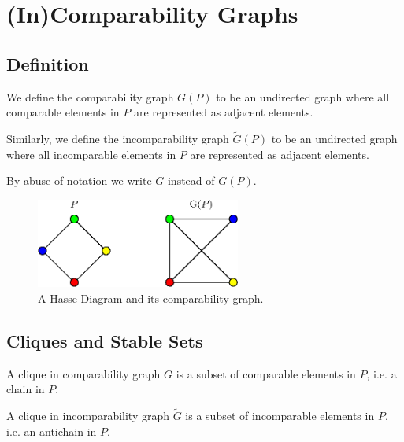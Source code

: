 \section{(In)Comparability Graphs}
\label{tree:poset:graph}


\subsection{Definition}

We define the comparability graph ${G}(P)$ to be an undirected graph where all comparable elements in $P$ are represented as adjacent elements.

Similarly, we define the incomparability graph $\widetilde{G}(P)$ to be an undirected graph where all incomparable elements in $P$ are represented as adjacent elements.

By abuse of notation we write ${G}$ instead of ${G}(P)$.



\begin{figure}
	\centering
	\includegraphics[width=0.6\textwidth]{fig/comp-graph}
	\caption{\label{fig:comp-graph} A Hasse Diagram and its comparability graph.}
\end{figure}




\subsection{Cliques and Stable Sets}


A clique in comparability graph ${G}$ is a subset of comparable  elements in ${P}$, i.e. a chain in ${P}$.

A clique in incomparability graph $\widetilde{G}$ is a subset of incomparable  elements in ${P}$, i.e. an antichain in ${P}$.


